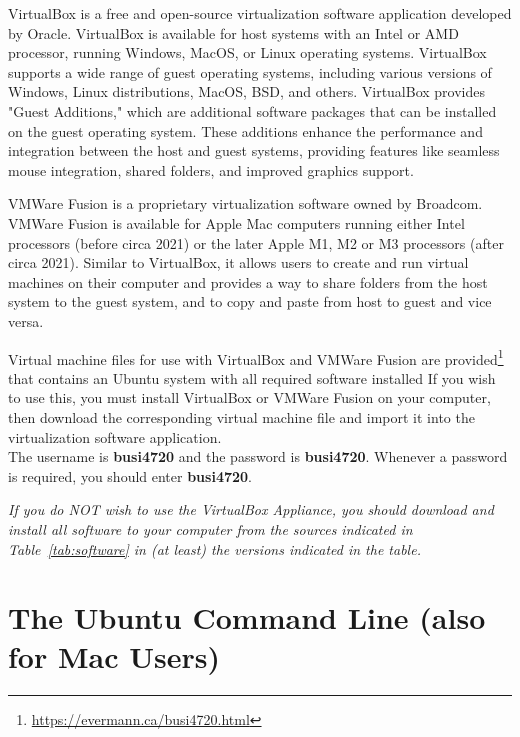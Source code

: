 VirtualBox is a free and open-source virtualization software application developed by Oracle. VirtualBox is available for host systems with an Intel or AMD processor, running Windows, MacOS, or Linux operating systems. VirtualBox supports a wide range of guest operating systems, including various versions of Windows, Linux distributions, MacOS, BSD, and others. VirtualBox provides "Guest Additions," which are additional software packages that can be installed on the guest operating system. These additions enhance the performance and integration between the host and guest systems, providing features like seamless mouse integration, shared folders, and improved graphics support. 

VMWare Fusion is a proprietary virtualization software owned by Broadcom. VMWare Fusion is available for Apple Mac computers running either Intel processors (before circa 2021) or the later Apple M1, M2 or M3 processors (after circa 2021). Similar to VirtualBox, it allows users to create and run virtual machines on their computer and provides a way to share folders from the host system to the guest system, and to copy and paste from host to guest and vice versa. \\
 
\begin{tcolorbox}[colback=alert]
\noindent Virtual machine files for use with VirtualBox and VMWare Fusion are provided\footnote{\url{https://evermann.ca/busi4720.html}} that contains an Ubuntu system with all required software installed
If you wish to use this, you must install VirtualBox or VMWare Fusion on your computer, then download the corresponding virtual machine file and import it into the virtualization software application.  \\

The username is \textbf{busi4720} and the password is \textbf{busi4720}. Whenever a password is required, you should enter \textbf{busi4720}.
\end{tcolorbox}
  
\noindent \begin{tcolorbox}[colback=alert]\emph{If you do NOT wish to use the VirtualBox Appliance, you should download and install all software to your computer from the sources indicated in Table~\ref{tab:software} in (at least) the versions indicated in the table.}\end{tcolorbox}
 
\section{The Ubuntu Command Line (also for Mac Users)}

